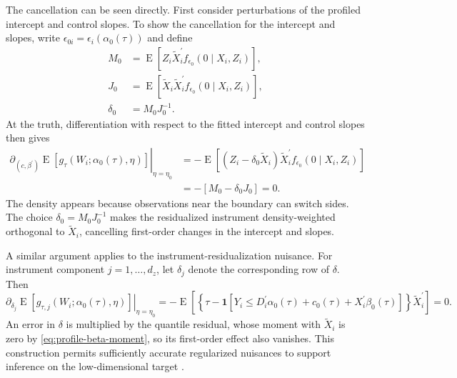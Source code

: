The cancellation can be seen directly. First consider perturbations of the profiled intercept and control slopes. To show the cancellation for the intercept and slopes, write $\epsilon_{0i}=\epsilon_i(\alpha_0(\tau))$ and define
\begin{equation}
    \begin{aligned}
        M_0
        &=\operatorname{E}\!\left[
            Z_i\widetilde X_i^{\prime}
            f_{\epsilon_0}(0\mid X_i,Z_i)
        \right],\\
        J_0
        &=\operatorname{E}\!\left[
            \widetilde X_i\widetilde X_i^{\prime}
            f_{\epsilon_0}(0\mid X_i,Z_i)
        \right],\\
        \delta_0&=M_0J_0^{-1}.
    \end{aligned}
    \label{eq:orthogonality-MJ}
\end{equation}
At the truth, differentiation with respect to the fitted intercept and control slopes then gives
\begin{equation}
    \begin{aligned}
        \left.
        \partial_{(c,\beta^{\prime})}
        \operatorname{E}\!\left[
            g_{\tau}\!\left(W_i;\alpha_0(\tau),\eta\right)
        \right]
        \right|_{\eta=\eta_0}
        &=-\operatorname{E}\!\left[
            (Z_i-\delta_0\widetilde X_i)\widetilde X_i^{\prime}
            f_{\epsilon_0}(0\mid X_i,Z_i)
        \right]\\
        &=-\left[M_0-\delta_0J_0\right]
        =0.
    \end{aligned}
    \label{eq:orthogonality-beta}
\end{equation}
The density appears because observations near the boundary can switch sides. The choice $\delta_0=M_0J_0^{-1}$ makes the residualized instrument density-weighted orthogonal to $\widetilde X_i$, cancelling first-order changes in the intercept and slopes.

A similar argument applies to the instrument-residualization nuisance. For instrument component $j=1,\ldots,d_z$, let $\delta_j$ denote the corresponding row of $\delta$. Then
\begin{equation}
    \left.
    \partial_{\delta_j}
    \operatorname{E}\!\left[
        g_{\tau,j}\!\left(W_i;\alpha_0(\tau),\eta\right)
    \right]
    \right|_{\eta=\eta_0}
    =-\operatorname{E}\!\left[
        \left\{
            \tau-\mathbf{1}\!\left[
                Y_i\leq D_i^{\prime}\alpha_0(\tau)
                +c_0(\tau)
                +X_i^{\prime}\beta_0(\tau)
            \right]
        \right\}\widetilde X_i^{\prime}
    \right]
    =0.
    \label{eq:orthogonality-delta}
\end{equation}
An error in $\delta$ is multiplied by the quantile residual, whose moment with $\widetilde X_i$ is zero by \eqref{eq:profile-beta-moment}, so its first-order effect also vanishes. This construction permits sufficiently accurate regularized nuisances to support inference on the low-dimensional target \parencite{chen_huang_tien_2021,chernozhukov_et_al_2018}.

